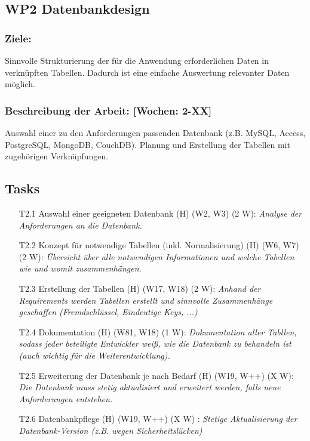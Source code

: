 \documentclass{report}
\begin{document}
\subsection*{WP2 Datenbankdesign}

\subsubsection{Ziele:} Sinnvolle Strukturierung der für die Anwendung erforderlichen Daten in verknüpften Tabellen. Dadurch ist eine einfache Auswertung relevanter Daten möglich.
\subsubsection{Beschreibung der Arbeit: [Wochen: 2-XX]} Auswahl einer zu den Anforderungen passenden Datenbank (z.B. MySQL, Access, PostgreSQL, MongoDB, CouchDB). Planung und Erstellung der Tabellen mit zugehörigen Verknüpfungen.


\subsection*{Tasks}

\begin{enumerate}
\item [T2.1] Auswahl einer geeigneten Datenbank (H) (W2, W3) (2 W): \emph{ Analyse der Anforderungen an die Datenbank.}
\item [T2.2] Konzept für notwendige Tabellen (inkl. Normalisierung) (H) (W6, W7) (2 W): \emph{ Übersicht über alle notwendigen Informationen und welche Tabellen wie und womit zusammenhängen.}
\item [T2.3] Erstellung der Tabellen (H) (W17, W18) (2 W): \emph{ Anhand der Requirements werden Tabellen erstellt und sinnvolle Zusammenhänge geschaffen (Fremdschlüssel, Eindeutige Keys, ...)}
\item [T2.4] Dokumentation (H) (W81, W18) (1 W): \emph{ Dokumentation aller Tabllen, sodass jeder beteiligte Entwickler weiß, wie die Datenbank zu behandeln ist (auch wichtig für die Weiterentwicklung).}
\item [T2.5] Erweiterung der Datenbank je nach Bedarf (H) (W19, W++) (X W): \emph{ Die Datenbank muss stetig aktualisiert und erweitert werden, falls neue Anforderungen entstehen.}
\item [T2.6] Datenbankpflege (H) (W19, W++) (X W) : \emph{ Stetige Aktualisierung der Datenbank-Version (z.B. wegen Sicherheitslücken)}
\end{enumerate}
\end{document}
